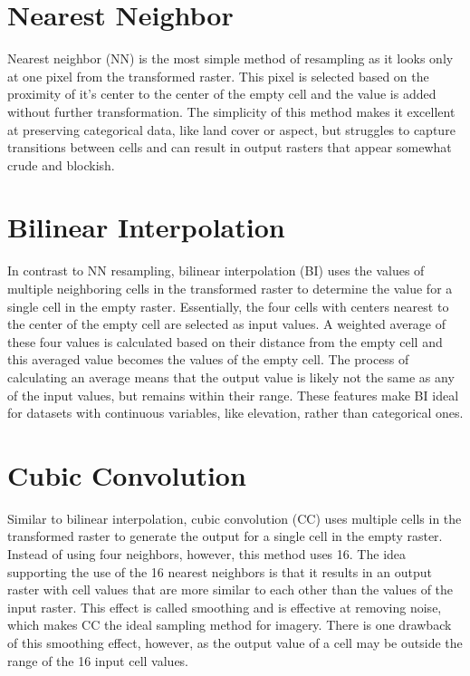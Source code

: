 \documentclass[
]{book}
\begin{document}
\hypertarget{nearest-neighbor-1}{%
\section{Nearest Neighbor}\label{nearest-neighbor-1}}

Nearest neighbor (NN) is the most simple method of resampling as it
looks only at one pixel from the transformed raster. This pixel is
selected based on the proximity of it's center to the center of the
empty cell and the value is added without further transformation. The
simplicity of this method makes it excellent at preserving categorical
data, like land cover or aspect, but struggles to capture transitions
between cells and can result in output rasters that appear somewhat
crude and blockish.

\hypertarget{bilinear-interpolation}{%
\section{Bilinear Interpolation}\label{bilinear-interpolation}}

In contrast to NN resampling, bilinear interpolation (BI) uses the
values of multiple neighboring cells in the transformed raster to
determine the value for a single cell in the empty raster. Essentially,
the four cells with centers nearest to the center of the empty cell are
selected as input values. A weighted average of these four values is
calculated based on their distance from the empty cell and this averaged
value becomes the values of the empty cell. The process of calculating
an average means that the output value is likely not the same as any of
the input values, but remains within their range. These features make BI
ideal for datasets with continuous variables, like elevation, rather
than categorical ones.

\hypertarget{cubic-convolution}{%
\section{Cubic Convolution}\label{cubic-convolution}}

Similar to bilinear interpolation, cubic convolution (CC) uses multiple
cells in the transformed raster to generate the output for a single cell
in the empty raster. Instead of using four neighbors, however, this
method uses 16. The idea supporting the use of the 16 nearest neighbors
is that it results in an output raster with cell values that are more
similar to each other than the values of the input raster. This effect
is called smoothing and is effective at removing noise, which makes CC
the ideal sampling method for imagery. There is one drawback of this
smoothing effect, however, as the output value of a cell may be outside
the range of the 16 input cell values.
\end{document}
